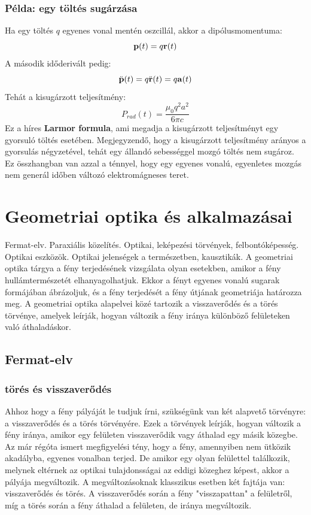 \documentclass[a4paper,12pt]{article}
\begin{document}
\subsubsection*{Példa: egy töltés sugárzása}
Ha egy töltés $q$ egyenes vonal mentén oszcillál, akkor a dipólusmomentuma:
\begin{equation}
    \bold{p}(t) = q \bold{r}(t)
\end{equation}
A második időderivált pedig:
\begin{equation}
    \ddot{\bold{p}}(t) = q \ddot{\bold{r}}(t) = q \bold{a}(t)
\end{equation}
Tehát a kisugárzott teljesítmény:
\begin{equation}
    P_{rad}(t) = \frac{\mu_0 q^2 a^2}{6 \pi c}
\end{equation}
Ez a híres \textbf{Larmor formula}, ami megadja a kisugárzott teljesítményt egy gyorsuló töltés esetében. Megjegyzendő, hogy a kisugárzott teljesítmény arányos a gyorsulás négyzetével, tehát egy állandó sebességgel mozgó töltés nem sugároz.
Ez összhangban van azzal a ténnyel, hogy egy egyenes vonalú, egyenletes mozgás nem generál időben változó elektromágneses teret.

\newpage
\section{Geometriai optika és alkalmazásai}
Fermat-elv. Paraxiális közelítés. Optikai, leképezési törvények, felbontóképesség. Optikai eszközök. Optikai jelenségek a természetben, kausztikák.
\newline
\newline
A geometriai optika tárgya a fény terjedésének vizsgálata olyan esetekben, amikor a fény hullámtermészetét elhanyagolhatjuk. Ekkor a fényt egyenes vonalú sugarak formájában ábrázoljuk,
és a fény terjedését a fény útjának geometriája határozza meg. A geometriai optika alapelvei közé tartozik a visszaverődés és a törés törvénye, amelyek leírják, hogyan változik a fény iránya különböző felületeken való áthaladáskor.

\subsection{Fermat-elv}
\subsubsection{törés és visszaverődés}
Ahhoz hogy a fény pályáját le tudjuk írni, szükségünk van két alapvető törvényre: a visszaverődés és a törés törvényére. Ezek a törvények leírják, hogyan változik a fény iránya, amikor egy felületen visszaverődik vagy áthalad egy másik közegbe.
Az már régóta ismert megfigyelési tény, hogy a fény, amennyiben nem ütközik akadályba, egyenes vonalban terjed. De amikor egy olyan felülettel találkozik, melynek eltérnek az optikai tulajdonsságai az 
eddigi közeghez képest, akkor a pályája megváltozik. A megváltozásoknak klasszikus esetben két fajtája van: visszaverődés és törés. A visszaverődés során a fény "visszapattan" a felületről, míg a törés során a fény áthalad a felületen, de iránya megváltozik.
\end{document}
